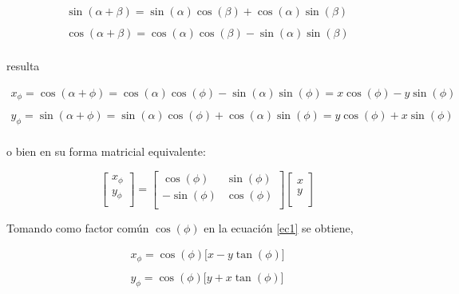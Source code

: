 \begin{equation}
\begin{array}{l}
\sin(\alpha+\beta)=\sin(\alpha)\cos(\beta)+\cos(\alpha)\sin(\beta)\\
\\
\cos(\alpha+\beta)=\cos(\alpha)\cos(\beta)-\sin(\alpha)\sin(\beta)\\
\end{array}
\end{equation}

resulta

\begin{equation}
\label{ec1}
\begin{array}{l}
x_{\phi}=\cos(\alpha+\phi)=\cos(\alpha)\cos(\phi)-\sin(\alpha)\sin(\phi)=x\cos(\phi)-y\sin(\phi)\\
\\
y_{\phi}=\sin(\alpha+\phi)=\sin(\alpha)\cos(\phi)+\cos(\alpha)\sin(\phi)=y\cos(\phi)+x\sin(\phi)\\
\end{array}
\end{equation}

o bien en su forma matricial equivalente:

\begin{equation}
\left[
\begin{array}{c}
x_{\phi}\\
y_{\phi}\\
\end{array}
\right]
=
\left[
\begin{array}{cc}
\cos(\phi) & \sin(\phi)\\
-\sin(\phi) & \cos(\phi)\\
\end{array}
\right]
\left[
\begin{array}{c}
x\\
y\\
\end{array}
\right]
\end{equation}

Tomando como factor común $\cos(\phi)$ en la ecuación \ref{ec1} se obtiene,

\begin{equation}
\begin{array}{l}
x_{\phi}=\cos(\phi)\lbrack x-y\tan(\phi)\rbrack\\
\\
y_{\phi}=\cos(\phi)\lbrack y+x\tan(\phi)\rbrack\\
\end{array}
\end{equation}

